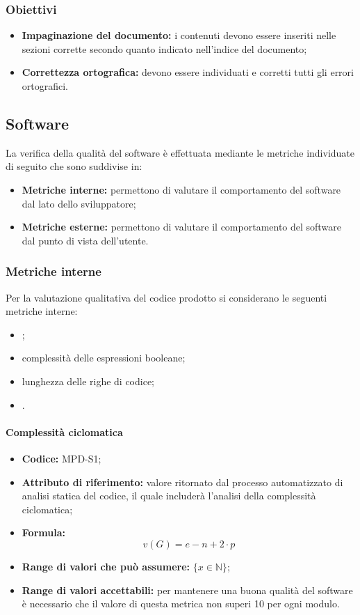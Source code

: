 \subsubsection{Obiettivi}
\begin{itemize}
    \item \textbf{Impaginazione del documento:} i contenuti devono essere inseriti nelle sezioni corrette secondo quanto indicato nell'indice del documento;
    \item \textbf{Correttezza ortografica:} devono essere individuati e corretti tutti gli errori ortografici.
\end{itemize}

\subsection{Software}
La verifica della qualità del software è effettuata mediante le metriche individuate di seguito che sono suddivise in:

\begin{itemize}
    \item \textbf{Metriche interne:} permettono di valutare il comportamento del software dal lato dello sviluppatore;
    \item \textbf{Metriche esterne:} permettono di valutare il comportamento del software dal punto di vista dell'utente.
\end{itemize}


\subsubsection{Metriche interne}
\label{_metricheQualitaCodice}
Per la valutazione qualitativa del codice prodotto si considerano le seguenti metriche interne:
\begin{itemize}
    \item {};
    \item complessità delle espressioni booleane;
    \item lunghezza delle righe di codice;
    \item {}.
\end{itemize}

\paragraph{Complessità ciclomatica}
\begin{itemize}
    \item \textbf{Codice:} MPD-S1;
    \item \textbf{Attributo di riferimento:} valore ritornato dal processo automatizzato di analisi statica del codice, il quale includerà l'analisi della complessità ciclomatica;
    \item \textbf{Formula:} \[ v(G)=e-n+2\cdot p \]
    \item \textbf{Range di valori che può assumere:} $\{x \in \mathbb{N} \}$;
    \item \textbf{Range di valori accettabili:} per mantenere una buona qualità del software è necessario che il valore di questa metrica non superi
    10 per ogni modulo.
\end{itemize}

